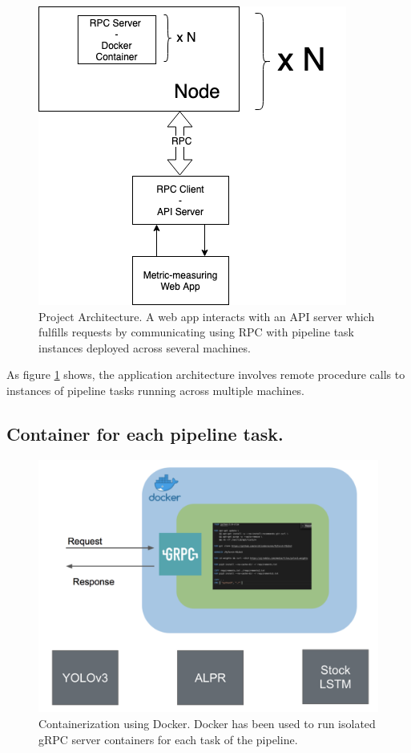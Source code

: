 \documentclass{report}
\begin{document}
\begin{figure}[h!]
  \includegraphics[width=\textwidth]{Infrastructure.png}
  \caption{Project Architecture. A web app interacts with an API server which fulfills requests by communicating using RPC with pipeline task instances deployed across several machines.}
  \label{fig:Infrastructure}
\end{figure}

As figure \ref{fig:Infrastructure} shows, the application architecture involves remote procedure calls to instances of pipeline tasks running across multiple machines.

\subsection{Container for each pipeline task.}

\begin{figure}[h!]
  \includegraphics[width=\textwidth]{docker.png}
  \caption{Containerization using Docker. Docker has been used to run isolated gRPC server containers for each task of the pipeline.}
  \label{fig:YOLOResults}
\end{figure}
\end{document}
